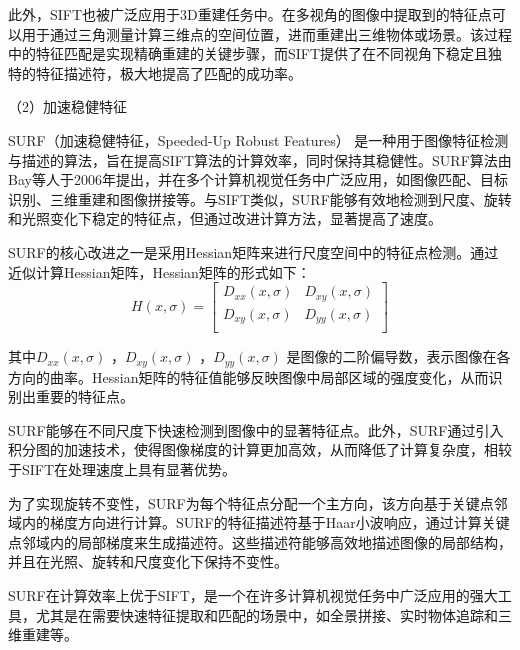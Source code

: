 此外，SIFT也被广泛应用于3D重建任务中。在多视角的图像中提取到的特征点可以用于通过三角测量计算三维点的空间位置，进而重建出三维物体或场景。该过程中的特征匹配是实现精确重建的关键步骤，而SIFT提供了在不同视角下稳定且独特的特征描述符，极大地提高了匹配的成功率。
 
 \noindent
 （2）加速稳健特征
 
SURF\cite{bay2006surf}（加速稳健特征，Speeded-Up Robust Features） 是一种用于图像特征检测与描述的算法，旨在提高SIFT算法的计算效率，同时保持其稳健性。SURF算法由Bay等人于2006年提出，并在多个计算机视觉任务中广泛应用，如图像匹配、目标识别、三维重建和图像拼接等。与SIFT类似，SURF能够有效地检测到尺度、旋转和光照变化下稳定的特征点，但通过改进计算方法，显著提高了速度。

SURF的核心改进之一是采用Hessian矩阵来进行尺度空间中的特征点检测。通过近似计算Hessian矩阵，Hessian矩阵的形式如下：
\begin{equation}
	\label{equ:Hessian}
	H(x,\sigma) =
	\begin{bmatrix}
		D_{xx}(x,\sigma) & D_{xy}(x,\sigma)  \\
		D_{xy}(x,\sigma)  & D_{yy}(x,\sigma) \\
	\end{bmatrix}
\end{equation}

其中$D_{xx}(x,\sigma)$ ，$D_{xy}(x,\sigma)$ ，$D_{yy}(x,\sigma)$ 是图像的二阶偏导数，表示图像在各方向的曲率。Hessian矩阵的特征值能够反映图像中局部区域的强度变化，从而识别出重要的特征点。

SURF能够在不同尺度下快速检测到图像中的显著特征点。此外，SURF通过引入积分图的加速技术，使得图像梯度的计算更加高效，从而降低了计算复杂度，相较于SIFT在处理速度上具有显著优势。

为了实现旋转不变性，SURF为每个特征点分配一个主方向，该方向基于关键点邻域内的梯度方向进行计算。SURF的特征描述符基于Haar小波响应，通过计算关键点邻域内的局部梯度来生成描述符。这些描述符能够高效地描述图像的局部结构，并且在光照、旋转和尺度变化下保持不变性。

SURF在计算效率上优于SIFT，是一个在许多计算机视觉任务中广泛应用的强大工具，尤其是在需要快速特征提取和匹配的场景中，如全景拼接、实时物体追踪和三维重建等。
 
